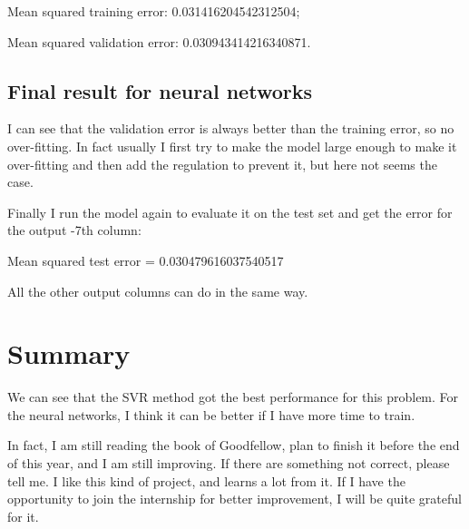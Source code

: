 \documentclass[12pt]{article}
\numberwithin{equation}{section}
\begin{document}
Mean squared training error: 0.031416204542312504;

Mean squared validation error: 0.030943414216340871.

\subsection{Final result for neural networks}
I can see that the validation error is always better than the training error, so no over-fitting. In fact usually I first try to make the model large enough to make it over-fitting and then add the regulation to prevent it, but here not seems the case.

Finally I run the model again to evaluate it on the test set and get the error for the output -7th column:

Mean squared test error = 0.030479616037540517

All the other output columns can do in the same way.

\section{Summary}
We can see that the SVR method got the best performance for this problem. For the neural networks, I think it can be better if I have more time to train. 

In fact, I am still reading the book of Goodfellow\cite{Goodfellow-et-al-2016-Book}, plan to finish it before the end of this year, and I am still improving. If there are something not correct, please tell me. I like this kind of project, and learns a lot from it. If I have the opportunity to join the internship for better improvement, I will be quite grateful for it.

\renewcommand\refname{Reference}



  \clearpage
\end{document}
